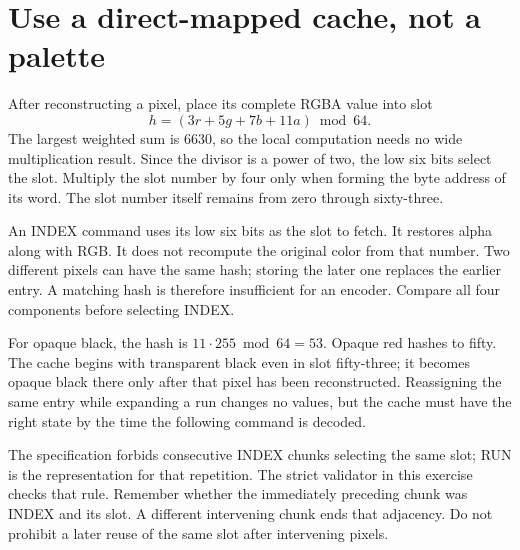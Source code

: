 \section{Use a direct-mapped cache, not a palette}
After reconstructing a pixel, place its complete RGBA value into slot
\[
  h=(3r+5g+7b+11a)\bmod64.
\]
The largest weighted sum is 6630, so the local computation needs no wide multiplication
result. Since the divisor is a power of two, the low six bits select the slot. Multiply
the slot number by four only when forming the byte address of its word. The slot number
itself remains from zero through sixty-three.

An INDEX command uses its low six bits as the slot to fetch. It restores alpha along
with RGB. It does not recompute the original color from that number. Two different
pixels can have the same hash; storing the later one replaces the earlier entry.
A matching hash is therefore insufficient for an encoder. Compare all four components
before selecting INDEX.

For opaque black, the hash is \(11\cdot255\bmod64=53\). Opaque red hashes to fifty.
The cache begins with transparent black even in slot fifty-three; it becomes opaque
black there only after that pixel has been reconstructed. Reassigning the same entry
while expanding a run changes no values, but the cache must have the right state by
the time the following command is decoded.

The specification forbids consecutive INDEX chunks selecting the same slot; RUN is
the representation for that repetition. The strict validator in this exercise checks
that rule. Remember whether the immediately preceding chunk was INDEX and its slot.
A different intervening chunk ends that adjacency. Do not prohibit a later reuse of
the same slot after intervening pixels.
